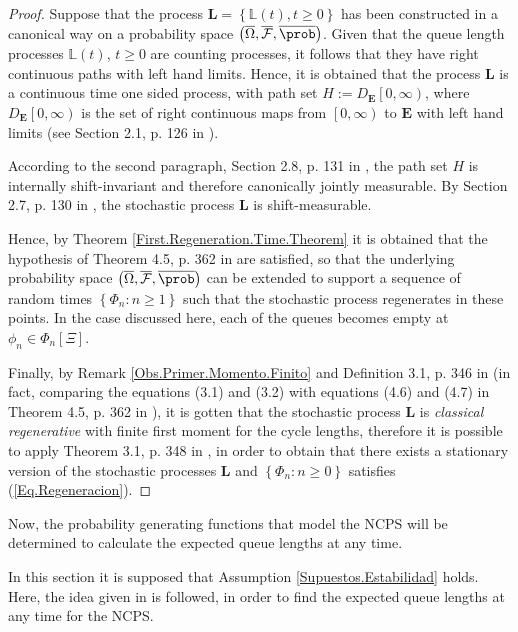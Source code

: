 \begin{proof}
Suppose that the process $\mathbf{L}=\left\{\mathbb{L}\left(t\right),t\geq0\right\}$ has been constructed in a canonical way on a probability space $\left(\overline{\Omega},\overline{\mathcal{F}},\overline{\prob}\right)$.
Given that the queue length processes $\mathbb{L}\left(t\right)$, $t\geq0$ are counting processes, it follows that they have right continuous paths with left hand limits. Hence, it is obtained that the process $\mathbf{L}$ is a continuous time one sided process, with path set $H:=D_{\mathbf{E}}\left[0,\infty\right)$, where  $D_{\mathbf{E}}\left[0,\infty\right)$ is the set of right continuous  maps from $\left[0,\infty\right)$ to $\mathbf{E}$ with left hand limits (see Section 2.1,  p. 126 in \cite{Thorisson}).

According to the second paragraph, Section 2.8, p. 131 in \cite{Thorisson}, the path set $H$ is internally shift-invariant and therefore canonically jointly measurable. By Section 2.7, p. 130 in \cite{Thorisson}, the stochastic process $\mathbf{L}$ is shift-measurable. 

Hence, by Theorem \ref{First.Regeneration.Time.Theorem} it is obtained that the hypothesis of Theorem 4.5, p. 362 in \cite{Thorisson} are satisfied, so that the underlying probability space $\left(\overline{\Omega},\overline{\mathcal{F}},\overline{\prob}\right)$ can be extended to support a sequence of random times $\left\{\Phi_{n}:n\geq1\right\}$ such that the stochastic process regenerates in these points. In the case discussed here, each of the queues becomes empty at $\phi_{n}\in\Phi_{n}\left[\Xi\right]$.

Finally, by Remark \ref{Obs.Primer.Momento.Finito} and Definition 3.1, p. 346 in \cite{Thorisson} (in fact, comparing the equations (3.1) and (3.2) with equations (4.6) and (4.7) in Theorem 4.5, p. 362 in \cite{Thorisson}), it is gotten that the stochastic process $\mathbf{L}$ is {\it{classical regenerative}} with finite first moment for the cycle lengths, therefore it is possible to apply Theorem 3.1, p. 348 in \cite{Thorisson}, in order to obtain that there exists a stationary version of the stochastic processes $\mathbf{L}$ and $\left\{\Phi_{n}:n\geq0\right\}$ satisfies (\ref{Eq.Regeneracion}).
\end{proof}%
\medskip
Now, the probability generating functions that model the NCPS will be determined to calculate the expected queue lengths at any time.

In this section it is supposed that Assumption \ref{Supuestos.Estabilidad} holds. Here, the idea given in \cite{Takagi} is followed, in order to find the expected queue lengths at any time for the NCPS. 

